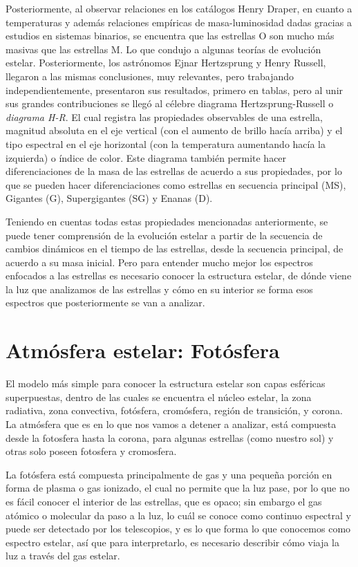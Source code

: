\documentclass[12pt,oneside,openany,letter]{book}
\begin{document}
\noindent Posteriormente, al observar relaciones en los catálogos Henry Draper, en cuanto a temperaturas y además relaciones empíricas de masa-luminosidad dadas gracias a estudios en sistemas binarios, se encuentra que las estrellas O son mucho más masivas que las estrellas M. Lo que condujo a algunas teorías de evolución estelar. Posteriormente, los astrónomos Ejnar Hertzsprung y Henry Russell, llegaron a las mismas conclusiones, muy relevantes, pero trabajando independientemente, presentaron sus resultados, primero en tablas, pero al unir sus grandes contribuciones se llegó al célebre diagrama Hertzsprung-Russell o  \textit{diagrama H-R}. El cual registra las propiedades observables de una estrella, magnitud absoluta en el eje vertical (con el aumento de brillo hacía arriba) y el tipo espectral en el eje horizontal (con la temperatura aumentando hacía la izquierda) o índice de color. Este diagrama también permite hacer diferenciaciones de la masa de las estrellas de acuerdo a sus propiedades, por lo que se pueden hacer diferenciaciones como estrellas en secuencia principal (MS), Gigantes (G), Supergigantes (SG) y Enanas (D).
\vspace{2mm}

\noindent Teniendo en cuentas todas estas propiedades mencionadas anteriormente, se puede tener comprensión de la evolución estelar a partir de la secuencia de cambios dinámicos en el tiempo de las estrellas, desde la secuencia principal, de acuerdo a su masa inicial. Pero para entender mucho mejor los espectros enfocados a las estrellas es necesario conocer la estructura estelar, de dónde viene la luz que analizamos de las estrellas y cómo en su interior se forma esos espectros que posteriormente se van a analizar.


\section{Atmósfera estelar: Fotósfera}\label{sec:atm_est}
El modelo más simple para conocer la estructura estelar son capas esféricas superpuestas, dentro de las cuales se encuentra el núcleo estelar, la zona radiativa, zona convectiva, fotósfera, cromósfera, región de transición, y corona. La atmósfera que es en lo que nos vamos a detener a analizar, está compuesta desde la fotosfera hasta la corona, para algunas estrellas (como nuestro sol) y otras solo poseen fotosfera y cromosfera.
\vspace{2mm}

\noindent La fotósfera está compuesta principalmente de gas y una pequeña porción en forma de plasma o gas ionizado, el cual no permite que la luz pase, por lo que no es fácil conocer el interior de las estrellas, que es opaco; sin embargo el gas atómico o molecular da paso a la luz, lo cuál se conoce como continuo espectral y puede ser detectado por los telescopios, y es lo que forma lo que conocemos como espectro estelar, así que para interpretarlo, es necesario describir cómo viaja la luz a través del gas estelar. 
\end{document}
